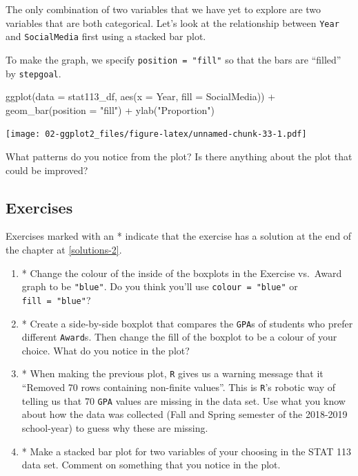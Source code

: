 \documentclass[
]{book}
\newenvironment{Shaded}{\begin{snugshade}}{\end{snugshade}}
\newcommand{\AttributeTok}[1]{\textcolor[rgb]{0.77,0.63,0.00}{#1}}
\newcommand{\FunctionTok}[1]{\textcolor[rgb]{0.00,0.00,0.00}{#1}}
\newcommand{\NormalTok}[1]{#1}
\newcommand{\SpecialCharTok}[1]{\textcolor[rgb]{0.00,0.00,0.00}{#1}}
\newcommand{\StringTok}[1]{\textcolor[rgb]{0.31,0.60,0.02}{#1}}
\begin{document}
The only combination of two variables that we have yet to explore are two variables that are both categorical. Let's look at the relationship between \texttt{Year} and \texttt{SocialMedia} first using a stacked bar plot.

To make the graph, we specify \texttt{position\ =\ "fill"} so that the bars are ``filled'' by \texttt{stepgoal}.

\begin{Shaded}
\begin{Highlighting}[]
\FunctionTok{ggplot}\NormalTok{(}\AttributeTok{data =}\NormalTok{ stat113\_df, }\FunctionTok{aes}\NormalTok{(}\AttributeTok{x =}\NormalTok{ Year, }\AttributeTok{fill =}\NormalTok{ SocialMedia)) }\SpecialCharTok{+}
  \FunctionTok{geom\_bar}\NormalTok{(}\AttributeTok{position =} \StringTok{"fill"}\NormalTok{) }\SpecialCharTok{+}
  \FunctionTok{ylab}\NormalTok{(}\StringTok{"Proportion"}\NormalTok{)}
\end{Highlighting}
\end{Shaded}

\texttt{[image: 02-ggplot2\_files/figure-latex/unnamed-chunk-33-1.pdf]}

What patterns do you notice from the plot? Is there anything about the plot that could be improved?

\hypertarget{exercise-2-3}{%
\subsection{Exercises}\label{exercise-2-3}}

Exercises marked with an * indicate that the exercise has a solution at the end of the chapter at \ref{solutions-2}.

\begin{enumerate}
\def\labelenumi{\arabic{enumi}.}
\item
  * Change the colour of the inside of the boxplots in the Exercise vs.~Award graph to be \texttt{"blue"}. Do you think you'll use \texttt{colour\ =\ "blue"} or \texttt{fill\ =\ "blue"}?
\item
  * Create a side-by-side boxplot that compares the \texttt{GPA}s of students who prefer different \texttt{Award}s. Then change the fill of the boxplot to be a colour of your choice. What do you notice in the plot?
\item
  * When making the previous plot, \texttt{R} gives us a warning message that it ``Removed 70 rows containing non-finite values''. This is \texttt{R}'s robotic way of telling us that 70 \texttt{GPA} values are missing in the data set. Use what you know about how the data was collected (Fall and Spring semester of the 2018-2019 school-year) to guess why these are missing.
\item
  * Make a stacked bar plot for two variables of your choosing in the STAT 113 data set. Comment on something that you notice in the plot.
\end{enumerate}
\end{document}
